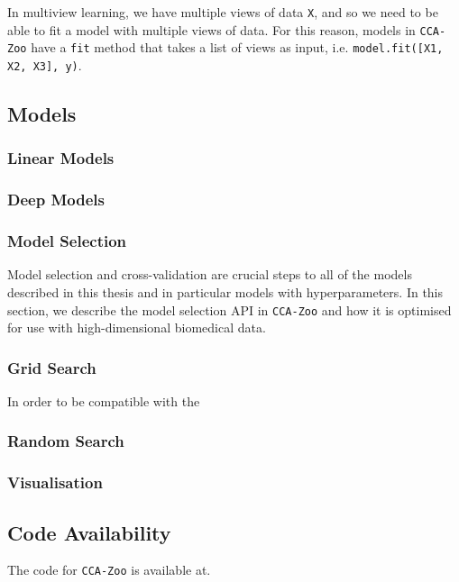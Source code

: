 In multiview learning, we have multiple views of data \texttt{X}, and so we need to be able to fit a model with multiple views of data.
For this reason, models in \texttt{CCA-Zoo} have a \texttt{fit} method that takes a list of views as input, i.e. \texttt{model.fit([X1, X2, X3], y)}.

\subsection{Models}

\subsubsection{Linear Models}

\subsubsection{Deep Models}


\subsubsection{Model Selection}

Model selection and cross-validation are crucial steps to all of the models described in this thesis and in particular models with hyperparameters.
In this section, we describe the model selection API in \texttt{CCA-Zoo} and how it is optimised for use with high-dimensional biomedical data.

\subsubsection{Grid Search}

In order to be compatible with the

\subsubsection{Random Search}

\subsubsection{Visualisation}


\subsection{Code Availability}

The code for \texttt{CCA-Zoo} is available at.

